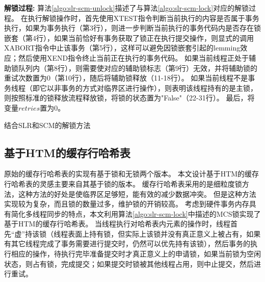 \textbf{解锁过程:}
算法\ref{algo:slr-scm-unlock}描述了与算法\ref{algo:slr-scm-lock}对应的解锁过程。
在执行解锁操作时，首先使用XTEST指令判断当前执行的内容是否属于事务执行，如果为事务执行（第3行），则进一步判断当前执行的事务代码内是否存在锁嵌套（第4行），如果当前恰好有事务获取了锁正在执行提交操作，则显式的调用XABORT指令中止该事务（第5行），这样可以避免因锁嵌套引起的lemming效应；然后使用XEND指令终止当前正在执行的事务代码。
如果当前线程正处于辅助锁队列内（第8行），则需要使对应的辅助锁标志（第9行）无效，并将辅助锁的重试次数置为0（第10行），随后将辅助锁释放（11-18行）。
如果当前线程不是事务线程（即它以非事务的方式对临界区进行操作），则表明该线程持有的是主锁，则按照标准的锁释放流程释放锁，将锁的状态置为"False"（22-31行）。
最后，将变量$retries$置为0。


\begin{algorithm}[htbp]
\SetAlgoLined
{}
\caption{结合SLR和SCM的解锁方法}
\label{algo:slr-scm-unlock}
\end{algorithm}

\subsection{基于HTM的缓存行哈希表}

原始的缓存行哈希表的实现有基于锁和无锁两个版本。
本文设计基于HTM的缓存行哈希表的灵感主要来自其基于锁的版本。
缓存行哈希表采用的是细粒度锁方法，这种方法的好处是使临界区足够短，能有效的减少数据冲突。
但是这种方法实现较为复杂，而且锁的数量过多，维护锁的开销较高。
考虑到硬件事务内存具有简化多线程同步的特点，本文利用算法\ref{algo:slr-scm-lock}中描述的MCS锁实现了基于HTM的缓存行哈希表。
当线程执行对哈希表内元素的操作时，线程首先“虚”持该锁（线程表面上持有锁，但实际上该锁并没有真正意义上被占有，如果有其它线程完成了事务需要进行提交时，仍然可以优先持有该锁），然后事务的执行相应的操作，待执行完毕准备提交时才真正意义上的申请锁，如果当前锁为空闲状态，则占有锁，完成提交；如果提交时锁被其他线程占用，则中止提交，然后进行重试。

